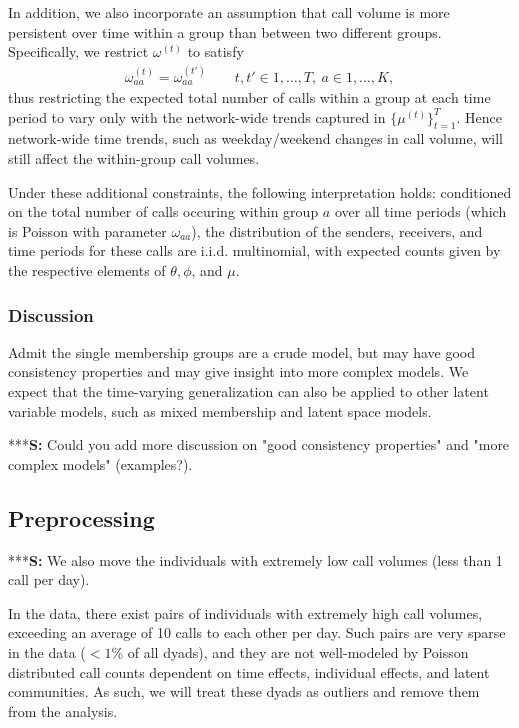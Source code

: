 \documentclass{article}
\begin{document}
In addition, we also incorporate an assumption that call volume is more persistent over time within a group than between two different groups. Specifically, we restrict $\omega^{(t)}$ to satisfy
\begin{align} \label{eq:constraint}
\omega_{aa}^{(t)} = \omega_{aa}^{(t')} \qquad t,t' \in 1,\ldots,T, \ a\in 1,\ldots,K,
\end{align}
thus restricting the expected total number of calls within a group at each time period to vary only with the network-wide trends captured in $\{\mu^{(t)}\}_{t=1}^T$. Hence network-wide time trends, such as weekday/weekend changes in call volume, will still affect the within-group call volumes.

Under these additional constraints, the following interpretation holds: conditioned on the total number of calls occuring within group $a$ over all time periods (which is Poisson with parameter $\omega_{aa}$), the distribution of the senders, receivers, and time periods for these calls are i.i.d. multinomial, with expected counts given by the respective elements of $\theta, \phi$, and $\mu$.


\subsubsection{Discussion}
Admit the single membership groups are a crude model, but may have good consistency properties and may give insight into more complex models. We expect that the time-varying generalization can also be applied to other latent variable models, such as mixed membership  and latent space models.

***\textbf{S:} Could you add more discussion on "good consistency properties" and "more complex models" (examples?).

\subsection{Preprocessing}
***\textbf{S:} We also move the individuals with extremely low call volumes (less than 1 call per day).

In the data, there exist pairs of individuals with extremely high call volumes, exceeding an average of 10 calls to each other per day. Such pairs are very sparse in the data ($<1 \%$ of all dyads), and they are not well-modeled by Poisson distributed call counts dependent on time effects, individual effects, and latent communities. As such, we will treat these dyads as outliers and remove them from the analysis.
\end{document}
